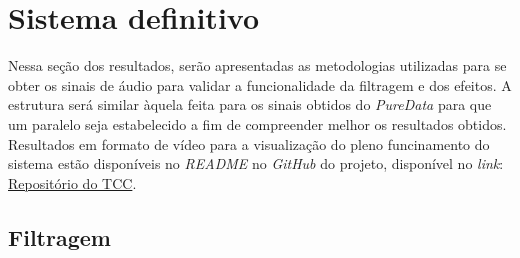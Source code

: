 





\section{Sistema definitivo}

Nessa seção dos resultados, serão apresentadas as metodologias utilizadas para se obter os sinais de áudio para validar a funcionalidade da filtragem e dos efeitos. A estrutura será similar àquela feita para os sinais obtidos do \textit{PureData} para que um paralelo seja estabelecido a fim de compreender melhor os resultados obtidos. Resultados em formato de vídeo para a visualização do pleno funcinamento do sistema estão disponíveis no \textit{README} no \textit{GitHub} do projeto, disponível no \textit{link}: \href{https://github.com/joselitopradomarques/tcc}{Repositório do TCC}.


\subsection{Filtragem}


